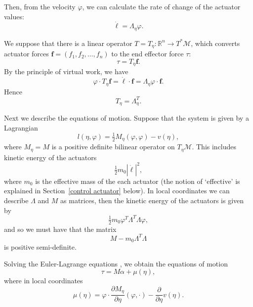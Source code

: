 \documentclass[reqno,twocolumn]{amsart}
\renewcommand{\mathsf}{}
\begin{document}
Then, from the velocity $\varphi$, we can calculate the rate of change of the actuator values:
\begin{equation}
\label{dot l Lambda phi}
\dot{\bm\ell} = \Lambda_\eta \varphi.
\end{equation}

We suppose that there is a linear operator $\mathsf T = \mathsf T_\eta : \mathbb R^n \to T^*\mathcal M$, which converts actuator forces $\bm f = (f_1,f_2,\dots,f_n)$
to the end effector force $\tau$:
\begin{equation}
\tau = \mathsf T_\eta \bm f.
\end{equation}
By the principle of virtual work, we have
\begin{equation}
\varphi \cdot \mathsf T_\eta \bm f = \dot{\bm\ell} \cdot \bm f = \mathsf\Lambda_\eta \varphi \cdot \bm f.
\end{equation}
Hence
\begin{equation}
\mathsf T_\eta = \mathsf\Lambda_\eta^T .
\end{equation}

Next we describe the equations of motion.  Suppose that the system is given by a Lagrangian
\begin{equation}
l(\eta,\varphi) = \tfrac12 \mathsf M_\eta(\varphi,\varphi) - v(\eta),
\end{equation}
where $\mathsf M_\eta = \mathsf M$ is a positive definite bilinear operator on $T_\eta\mathcal M$.  This includes kinetic energy of the actuators
\begin{equation}
\label{kin no load}
\tfrac 12 m_0 |\dot{\bm\ell}|^2,
\end{equation}
where $m_0$ is the effective mass of the each actuator (the notion of `effective' is explained in Section~\ref{control actuator} below).  In local coordinates we can describe $\mathsf\Lambda$ and $\mathsf M$ as matrices, then the kinetic energy of the actuators is given by
\begin{equation}
\tfrac12 m_0 \varphi^T \mathsf \Lambda^T \mathsf \Lambda \varphi,
\end{equation}
and so we must have that the matrix
\begin{equation}
\mathsf M - m_0 \mathsf \Lambda^T \mathsf \Lambda
\end{equation}
is positive semi-definite.

Solving the Euler-Lagrange equations \cite{arnold}, we obtain the equations of motion
\begin{equation}
\tau = \mathsf M \alpha + \mu(\eta) ,
\end{equation}
where in local coordinates
\begin{equation}
\mu(\eta) = \varphi \cdot \frac {\partial \mathsf M_\eta}{\partial \eta} (\varphi,\cdot) - \frac{\partial}{\partial \eta} v(\eta) .
\end{equation}
\end{document}
